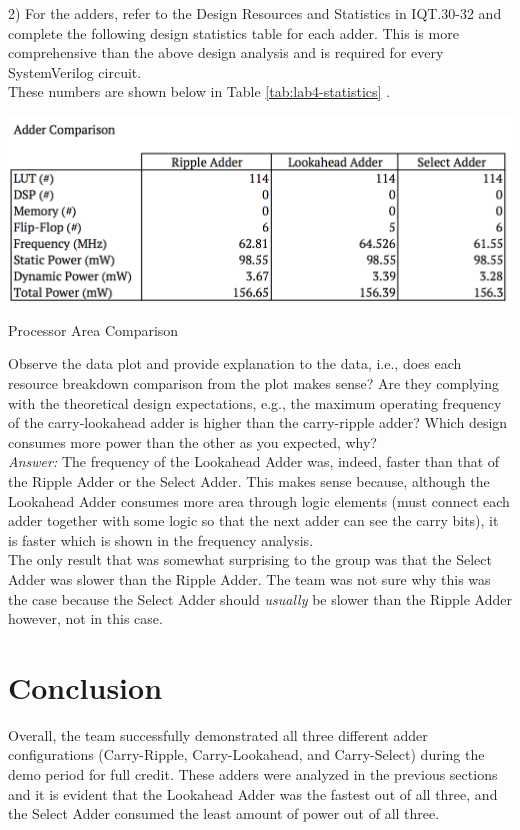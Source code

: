 \documentclass[journal, twocolumn, final,11pt,letterpaper]{IEEEtran}
\begin{document}
2) For the adders, refer to the Design Resources and Statistics in IQT.30-32 and complete
the following design statistics table for each adder. This is more comprehensive than the above
design analysis and is required for every SystemVerilog circuit.\\

These numbers are shown below in Table \ref{tab:lab4-statistics} .

\begin{table} [H]
	\centering
	\includegraphics[scale=0.35]{lab4-statistics.png}
	\caption{Processor Area Comparison\label{tab:lab4-statistics}}
\end{table}

Observe the data plot and provide explanation to the data, i.e., does each resource
breakdown comparison from the plot makes sense? Are they complying with the theoretical
design expectations, e.g., the maximum operating frequency of the carry-lookahead adder is
higher than the carry-ripple adder? Which design consumes more power than the other as you
expected, why?\\

\textit{Answer:} The frequency of the Lookahead Adder was, indeed, faster than that of the Ripple Adder or the Select Adder. This makes sense because, although the Lookahead Adder consumes more area through logic elements (must connect each adder together with some logic so that the next adder can see the carry bits), it is faster which is shown in the frequency analysis.\\

The only result that was somewhat surprising to the group was that the Select Adder was slower than the Ripple Adder. The team was not sure why this was the case because the Select Adder should \textit{usually} be slower than the Ripple Adder however, not in this case.

\section{Conclusion}
Overall, the team successfully demonstrated all three different adder configurations (Carry-Ripple, Carry-Lookahead, and Carry-Select) during the demo period for full credit. These adders were analyzed in the previous sections and it is evident that the Lookahead Adder was the fastest out of all three, and the Select Adder consumed the least amount of power out of all three.\\
\end{document}
